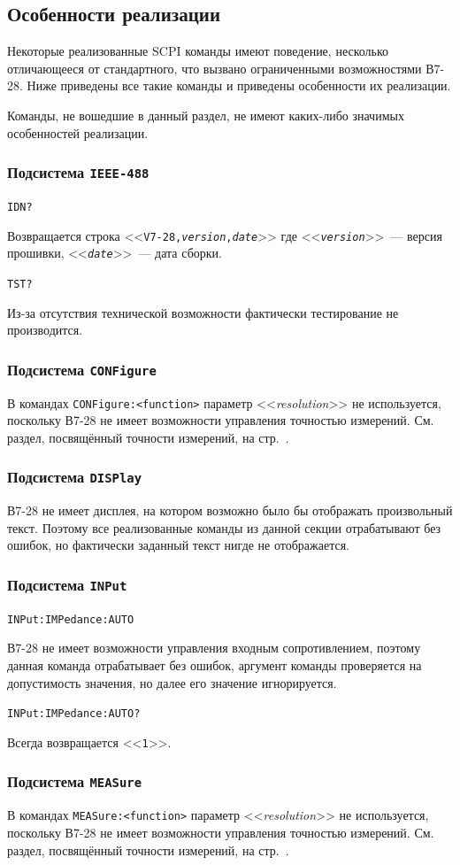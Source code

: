 \documentclass[12pt, a4paper]{article}
\newcommand{\V}{\mbox{В7-28}}
\newcommand{\CMD}[1]{{\tt #1}}
\newcommand{\PARAM}[1]{<<{\it #1}>>}
\newcommand{\RESPONSE}[1]{<<{\tt #1}>>}
\newcommand{\SUBSYSTEMSECTION}[1]{\subsubsection{Подсистема \CMD{#1}}}
\newcommand{\CMDSECTION}[1]{\CMD{#1}  }
\begin{document}
\subsection{Особенности реализации}

Некоторые реализованные SCPI команды имеют поведение, несколько отличающееся от стандартного, что вызвано ограниченными возможностями \V{}. Ниже приведены все такие команды и приведены особенности их реализации.

Команды, не вошедшие в данный раздел, не имеют каких-либо значимых особенностей реализации.

\SUBSYSTEMSECTION{IEEE-488}

\CMDSECTION{*IDN?}

Возвращается строка \RESPONSE{V7-28,{\it version},{\it date}} где \RESPONSE{{\it version}}~--- версия прошивки, \RESPONSE{{\it date}}~--- дата сборки.

\CMDSECTION{*TST?}

Из-за отсутствия технической возможности фактически тестирование не производится.

\SUBSYSTEMSECTION{CONFigure}

В командах \CMD{CONFigure:<function>} параметр \PARAM{resolution} не используется, поскольку \V{} не имеет возможности управления точностью измерений. См. раздел, посвящённый точности измерений, на стр.~\pageref{sec_precision}.

\SUBSYSTEMSECTION{DISPlay}

\V{} не имеет дисплея, на котором возможно было бы отображать произвольный текст. Поэтому все реализованные команды из данной секции отрабатывают без ошибок, но фактически заданный текст нигде не отображается.

\SUBSYSTEMSECTION{INPut}

\CMDSECTION{INPut:IMPedance:AUTO}

\V{} не имеет возможности управления входным сопротивлением, поэтому данная команда отрабатывает без ошибок, аргумент команды проверяется на допустимость значения, но далее его значение игнорируется.

\CMDSECTION{INPut:IMPedance:AUTO?}

Всегда возвращается \RESPONSE{1}.

\SUBSYSTEMSECTION{MEASure}

В командах \CMD{MEASure:<function>} параметр \PARAM{resolution} не используется, поскольку \V{} не имеет возможности управления точностью измерений. См. раздел, посвящённый точности измерений, на стр.~\pageref{sec_precision}.
\end{document}
